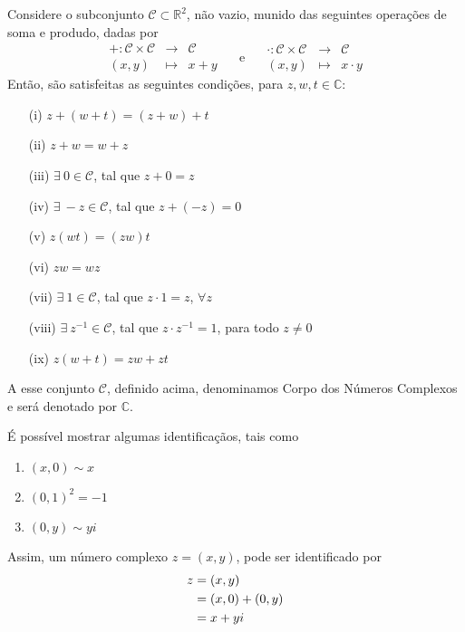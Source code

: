 \begin{proposicao}
  Considere o subconjunto $\mathcal{C} \subset \mathbb{R}^2$, não vazio, munido 
  das seguintes operações de \textsf{soma} e \textsf{produdo}, dadas por 
  \[
    \begin{array}{rcc}
      + \colon \mathcal{C}\times \mathcal{C} & \to & \mathcal{C} \\
       (x, y) & \mapsto & x + y 
    \end{array}
    \quad 
    \text{ e }
    \quad 
    \begin{array}{rcc}
      \cdot \colon \mathcal{C}\times \mathcal{C} & \to & \mathcal{C} \\
       (x, y) & \mapsto & x \cdot y 
    \end{array}
  \]
  Então, são satisfeitas as seguintes condições, para $z,w,t \in \mathbb{C}$:

  \begin{enumerate}
      \item[(i)] $z + (w + t) = (z + w) + t$
      \item[(ii)] $z + w = w + z$
      \item[(iii)] $ \exists\ 0 \in \mathcal{C}$, tal que $z + 0 = z$
      \item[(iv)] $ \exists\ -z \in \mathcal{C}$, tal que $ z + (-z) = 0 $
      \item[(v)] $z(wt) = (zw)t$
      \item[(vi)] $zw = wz$
      \item[(vii)] $ \exists\ 1 \in \mathcal{C} $, tal que $z \cdot 1 = z$, $\forall z$
      \item[(viii)] $ \exists\ z^{-1} \in \mathcal{C}$, tal que $z\cdot z^{-1} = 1$, para todo $z \neq 0$
      \item[(ix)] $ z (w + t) = zw + zt  $
  \end{enumerate}  
\end{proposicao}

\begin{definicao}
  A esse conjunto $\mathcal{C}$, definido acima, denominamos \textsf{Corpo dos Números Complexos} e 
  será denotado por $\mathbb{C}$.
\end{definicao}

\begin{obs}
  É possível mostrar algumas identificaçãos, tais como 
  \begin{enumerate}
    \item $ (x, 0) \sim x $
    \item $ (0, 1)^2 = -1 $
    \item $ (0, y) \sim yi $
  \end{enumerate}
  Assim, um número complexo $ z = (x, y) $, pode ser identificado por 
  \begin{align}
    z &= (x, y) \notag\\
      &= (x, 0) + (0, y) \notag \\
      &= x + yi \label{eq:algebrica}
  \end{align}
\end{obs}

